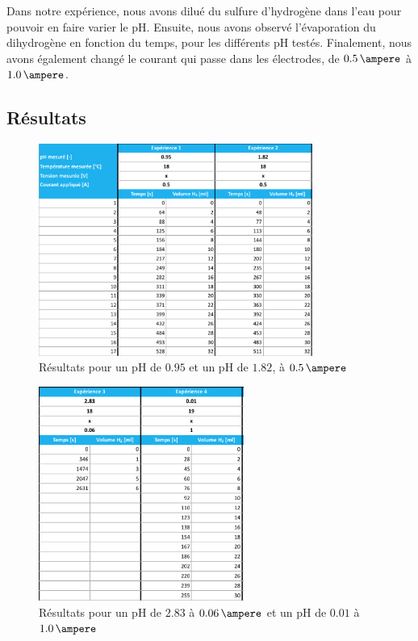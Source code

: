 Dans notre expérience, nous avons dilué du sulfure d'hydrogène dans l'eau pour pouvoir en faire varier le pH. Ensuite, nous avons observé l'évaporation du dihydrogène en fonction du temps, pour les différents pH testés. Finalement, nous avons également changé le courant qui passe dans les électrodes, de $0.5\,\ampere$ à $1.0\,\ampere$.

\subsection{Résultats}

\begin{figure}
\centering
\includegraphics[width=0.8\textwidth]{img/p2}
\caption{Résultats pour un pH de $0.95$ et un pH de $1.82$, à $0.5\,\ampere$}
\label{fig:elec-results1}
\end{figure}

\begin{figure}
\centering
\includegraphics[width=0.6\textwidth]{img/p3}
\caption{Résultats pour un pH de $2.83$ à $0.06\,\ampere$ et un pH de $0.01$ à $1.0\,\ampere$}
\label{fig:elec-results2}
\end{figure}

